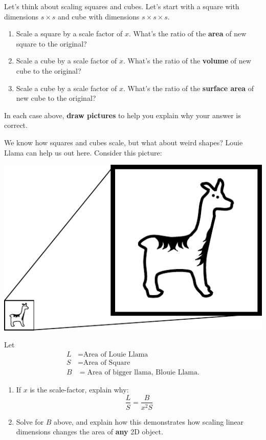 \documentclass[handout,nooutcomes,noauthor,hints]{ximera}
\begin{document}
\begin{question}
  Let's think about scaling squares and cubes. Let's start with a
  square with dimensions $s\times s$ and cube with dimensions $s\times
  s\times s$.
  \begin{enumerate}
  \item Scale a square by a scale factor of $x$. What's the ratio of the \textbf{area} of new square to the original?
  \item Scale a cube by a scale factor of $x$. What's the ratio of the \textbf{volume} of new cube to the original?
  \item Scale a cube by a scale factor of $x$. What's the ratio of the \textbf{surface area} of new cube to the original?
  \end{enumerate}
  In each case above, \textbf{draw pictures} to help you explain why your
  answer is correct.
\end{question}
\mynewpage

\begin{question}
  We know how squares and cubes scale, but what about weird shapes?
  Louie Llama can help us out here.  Consider this picture:
  \begin{center}
    \includegraphics{llamaScaled.pdf}
  \end{center}
  Let
  \begin{align*}
    L &= \text{Area of Louie Llama}\\
    S &= \text{Area of Square}\\
    B &= \text{Area of bigger llama, Blouie Llama}.
  \end{align*}
  \begin{enumerate}
  \item If $x$ is the scale-factor, explain why:
    \[
    \frac{L}{S} = \frac{B}{x^2 S}
    \]
  \item Solve for $B$ above, and explain how this demonstrates how
    scaling linear dimensions changes the area of \textbf{any} 2D object.
  \end{enumerate}
  
\end{question}
\end{document}
